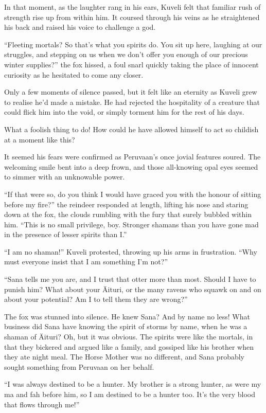 In that moment, as the laughter rang in his ears, Kuveli felt that familiar rush of strength rise up from within him. It coursed through his veins as he straightened his back and raised his voice to challenge a god.

``Fleeting mortals? So that's what you spirits do. You sit up here, laughing at our struggles, and stepping on us when we don't offer you enough of our precious winter supplies?'' the fox hissed, a foul snarl quickly taking the place of innocent curiosity as he hesitated to come any closer.

Only a few moments of silence passed, but it felt like an eternity as Kuveli grew to realise he'd made a mistake. He had rejected the hospitality of a creature that could flick him into the void, or simply torment him for the rest of his days.

What a foolish thing to do! How could he have allowed himself to act so childish at a moment like this?

It seemed his fears were confirmed as Peruvaan's once jovial features soured. The welcoming smile bent into a deep frown, and those all-knowing opal eyes seemed to simmer with an unknowable power.

``If that were so, do you think I would have graced you with the honour of sitting before my fire?'' the reindeer responded at length, lifting his nose and staring down at the fox, the clouds rumbling with the fury that surely bubbled within him. ``This is no small privilege, boy. Stronger shamans than you have gone mad in the presence of lesser spirits than I.''

``I am no shaman!'' Kuveli protested, throwing up his arms in frustration. ``Why must everyone insist that I am something I'm not?''

``Sana tells me you are, and I trust that otter more than most. Should I have to punish him? What about your Äituri, or the many ravens who squawk on and on about your potential? Am I to tell them they are wrong?''

The fox was stunned into silence. He knew Sana? And by name no less! What business did Sana have knowing the spirit of storms by name, when he was a shaman of Äituri? Oh, but it was obvious. The spirits were like the mortals, in that they bickered and argued like a family, and gossiped like his brother when they ate night meal. The Horse Mother was no different, and Sana probably sought something from Peruvaan on her behalf.

``I was always destined to be a hunter. My brother is a strong hunter, as were my ma and fah before him, so I am destined to be a hunter too. It's the very blood that flows through me!''

